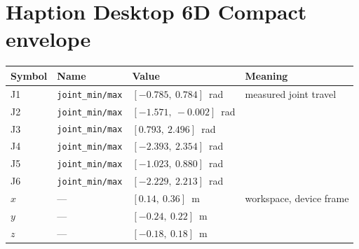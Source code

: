 \section{Haption Desktop 6D Compact envelope}
\begin{tabularx}{\linewidth}{@{}l>{\scriptsize}ll>{\raggedright\arraybackslash}X@{}}
\toprule
Symbol & Name & Value & Meaning \\
\midrule
J1 & \texttt{joint\_min/max} & $[-0.785,\ 0.784]$~rad & measured joint travel \\
J2 & \texttt{joint\_min/max} & $[-1.571,\ -0.002]$~rad & \\
J3 & \texttt{joint\_min/max} & $[0.793,\ 2.496]$~rad & \\
J4 & \texttt{joint\_min/max} & $[-2.393,\ 2.354]$~rad & \\
J5 & \texttt{joint\_min/max} & $[-1.023,\ 0.880]$~rad & \\
J6 & \texttt{joint\_min/max} & $[-2.229,\ 2.213]$~rad & \\
$x$ & --- & $[0.14,\ 0.36]$~m & workspace, device frame \\
$y$ & --- & $[-0.24,\ 0.22]$~m & \\
$z$ & --- & $[-0.18,\ 0.18]$~m & \\
\bottomrule
\end{tabularx}

